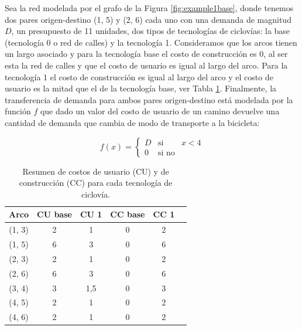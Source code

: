 Sea la red modelada por el grafo de la Figura \ref{fig:example1base}, donde tenemos dos pares origen-destino (1, 5) y (2, 6) cada uno con una demanda de magnitud $D$, un presupuesto de 11 unidades, dos tipos de tecnologías de ciclovías: la base (tecnología 0 o red de calles) y la tecnología 1. Consideramos que los arcos tienen un largo asociado y para la tecnología base el costo de construcción es 0, al ser esta la red de calles y que el costo de usuario es igual al largo del arco. Para la tecnología 1 el costo de construcción es igual al largo del arco y el costo de usuario es la mitad que el de la tecnología base, ver Tabla \ref{table:example1arccosts}. Finalmente, la transferencia de demanda para ambos pares origen-destino está modelada por la función $f$ que dado un valor del costo de usuario de un camino devuelve una cantidad de demanda que cambia de modo de transporte a la bicicleta:

$$
  f(x) = \left\{ \begin{array}{lcr}
          D & \mbox{si}    & x < 4 \\
          0 & \mbox{si no} &
  \end{array}
  \right.
$$

\begin{table}[h!]
  \centering
  \begin{tabular}{cccccc}
    \toprule
    Arco & CU base & CU 1 & CC base & CC 1 & \\
    \midrule
      (1, 3) & 2 & 1   & 0 & 2 \\
      (1, 5) & 6 & 3   & 0 & 6 \\
      (2, 3) & 2 & 1   & 0 & 2 \\
      (2, 6) & 6 & 3   & 0 & 6 \\
      (3, 4) & 3 & 1,5 & 0 & 3 \\
      (4, 5) & 2 & 1   & 0 & 2 \\
      (4, 6) & 2 & 1   & 0 & 2 \\
    \bottomrule
  \end{tabular}
    \caption{Resumen de costos de usuario (CU) y de construcción (CC) para cada tecnología de ciclovía.}\label{table:example1arccosts}
\end{table}

